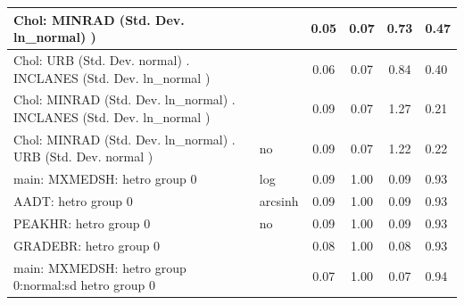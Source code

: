 \begin{table}
\begin{center}
\begin{tabular}{|l|l|c|c|c|l|}
			\hline
			 Chol: MINRAD (Std. Dev. ln_normal) ) &  & 0.05 & 0.07 & 0.73 & 0.47 \\
			\hline
			 Chol: URB (Std. Dev. normal) . INCLANES (Std. Dev.   ln_normal ) &  & 0.06 & 0.07 & 0.84 & 0.40 \\
			\hline
			 Chol: MINRAD (Std. Dev. ln_normal) . INCLANES (Std. Dev.   ln_normal ) &  & 0.09 & 0.07 & 1.27 & 0.21 \\
			\hline
			 Chol: MINRAD (Std. Dev. ln_normal) . URB (Std. Dev.   normal ) & no & 0.09 & 0.07 & 1.22 & 0.22 \\
			\hline
			main: MXMEDSH: hetro group 0 & log & 0.09 & 1.00 & 0.09 & 0.93 \\
			\hline
			AADT: hetro group 0 & arcsinh & 0.09 & 1.00 & 0.09 & 0.93 \\
			\hline
			PEAKHR: hetro group 0 & no & 0.09 & 1.00 & 0.09 & 0.93 \\
			\hline
			GRADEBR: hetro group 0 &  & 0.08 & 1.00 & 0.08 & 0.93 \\
			\hline
			main: MXMEDSH: hetro group 0:normal:sd  hetro group 0 &  & 0.07 & 1.00 & 0.07 & 0.94 \\
			\hline
		\end{tabular}
	\end{center}
\end{table}